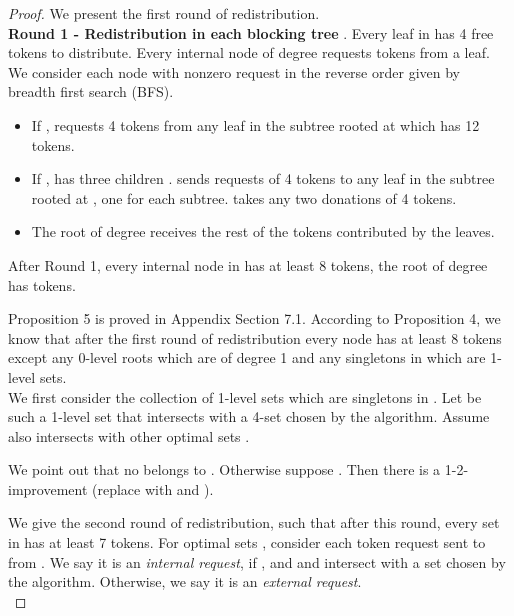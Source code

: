 \documentclass[runningheads,a4paper]{llncs}
\numberwithin{equation}{section}
\begin{document}
\begin{proof}
We present the first round of redistribution. \\



\textbf{Round 1 - Redistribution in each blocking tree }. Every leaf in  has 4 free tokens to distribute. Every internal node  of degree  requests  tokens from a leaf. We consider each node with nonzero request in the reverse order given by breadth first search (BFS).


        \begin{itemize}
            \item If ,  requests 4 tokens from any leaf in the subtree rooted at  which has 12 tokens.
            \item If ,  has three children .  sends requests of 4 tokens to any leaf in the subtree rooted at , one for each subtree.  takes any two donations of 4 tokens.
            \item The root of degree  receives the rest of the tokens contributed by the leaves.
        \end{itemize}

\begin{proposition}
After Round 1, every internal node in  has at least 8 tokens, the root of degree  has  tokens.
\label{prop1-k4}
\end{proposition}

Proposition 5 is proved in Appendix Section 7.1. According to Proposition 4, we know that after the first round of redistribution every node has at least 8 tokens except any 0-level roots which are of degree 1 and any singletons in  which are 1-level sets. \\

We first consider the collection of 1-level sets  which are singletons in . Let  be such a 1-level set that intersects with a 4-set  chosen by the algorithm. Assume  also intersects with  other optimal sets .

We point out that no  belongs to . Otherwise suppose . Then there is a 1-2-improvement (replace  with  and ).

We give the second round of redistribution, such that after this round, every set in  has at least 7 tokens.
For optimal sets , consider each token request sent to  from . We say it is an \emph{internal request}, if , and  and  intersect with a set  chosen by the algorithm. Otherwise, we say it is an \emph{external request}. \\


\end{proof}
\end{document}
